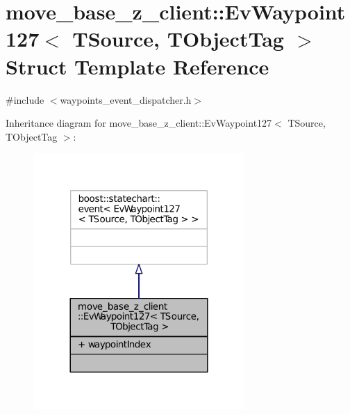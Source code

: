 \hypertarget{structmove__base__z__client_1_1EvWaypoint127}{}\section{move\+\_\+base\+\_\+z\+\_\+client\+:\+:Ev\+Waypoint127$<$ T\+Source, T\+Object\+Tag $>$ Struct Template Reference}
\label{structmove__base__z__client_1_1EvWaypoint127}


{\ttfamily \#include $<$waypoints\+\_\+event\+\_\+dispatcher.\+h$>$}



Inheritance diagram for move\+\_\+base\+\_\+z\+\_\+client\+:\+:Ev\+Waypoint127$<$ T\+Source, T\+Object\+Tag $>$\+:
\nopagebreak
\begin{figure}[H]
\begin{center}
\leavevmode
\includegraphics[width=228pt]{structmove__base__z__client_1_1EvWaypoint127__inherit__graph}
\end{center}
\end{figure}



